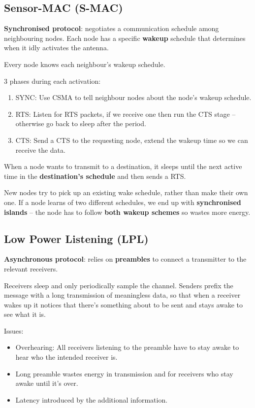 \documentclass[a4paper, 11pt]{article}
\begin{document}
{    \subsection*{Sensor-MAC (S-MAC)}
    {
        \textbf{Synchronised protocol}: negotiates a communication schedule among neighbouring nodes. Each node has a specific \textbf{wakeup} schedule that determines when it idly activates the antenna.

        Every node knows each neighbour's wakeup schedule.

        3 phases during each activation:
        \begin{enumerate}
        \item SYNC: Use CSMA to tell neighbour nodes about the node's wakeup schedule.
        \item RTS: Listen for RTS packets, if we receive one then run the CTS stage -- otherwise go back to sleep after the period.
        \item CTS: Send a CTS to the requesting node, extend the wakeup time so we can receive the data.
        \end{enumerate}

        When a node wants to transmit to a destination, it sleeps until the next active time in the \textbf{destination's schedule} and then sends a RTS.

        New nodes try to pick up an existing wake schedule, rather than make their own one. If a node learns of two different schedules, we end up with \textbf{synchronised islands} -- the node has to follow \textbf{both wakeup schemes} so wastes more energy.
    }
    \subsection*{Low Power Listening (LPL)}
    {
        \textbf{Asynchronous protocol}: relies on \textbf{preambles} to connect a transmitter to the relevant receivers.

        Receivers sleep and only periodically sample the channel. Senders prefix the message with a long transmission of meaningless data, so that when a receiver wakes up it notices that there's something about to be sent and stays awake to see what it is.

        Issues:
        \begin{itemize}
        \item Overhearing: All receivers listening to the preamble have to stay awake to hear who the intended receiver is.
        \item Long preamble wastes energy in transmission and for receivers who stay awake until it's over.
        \item Latency introduced by the additional information.
        \end{itemize}
    }
}
\end{document}
